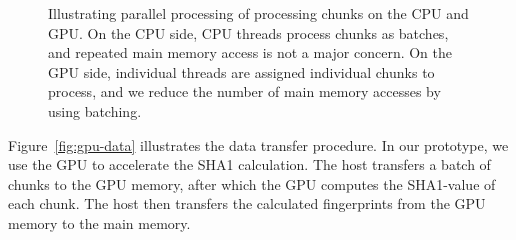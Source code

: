 \documentclass[prodmode,acmtecs]{acmsmall}
\begin{document}
\begin{figure}[htbp]

\caption{Illustrating parallel processing of processing chunks on the CPU and GPU.  On the CPU side, CPU threads process chunks as batches, and repeated main memory access is not a major concern.  On the GPU side, individual threads are assigned individual chunks to process, and we reduce the number of main memory accesses by using batching.}
\label{fig:thread}
\end{figure}

Figure~\ref{fig:gpu-data} illustrates the data transfer procedure. In our prototype, we use the GPU to accelerate the SHA1 calculation.  The host transfers a batch of chunks to the GPU memory, after which the GPU computes the SHA1-value of each chunk. The host then transfers the calculated fingerprints from the GPU memory to the main memory.
\end{document}
